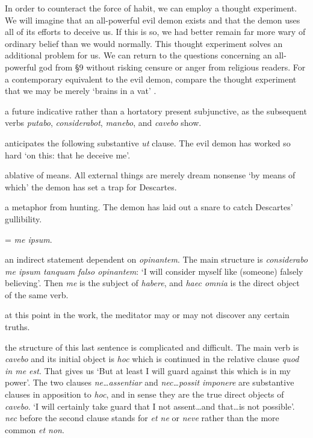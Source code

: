 \prenotes

In order to counteract the force of habit, we can employ a thought experiment. We will imagine that an all-powerful evil demon exists and that the demon uses all of its efforts to deceive us. If this is so, we had better remain far more wary of ordinary belief than we would normally. This thought experiment solves an additional problem for us. We can return to the questions concerning an all-powerful god from §9 without risking censure or anger from religious readers. For a contemporary equivalent to the evil demon, compare the thought experiment that we may be merely `brains in a vat' \citep[5]{harman1973}.

 a future indicative rather than a hortatory present subjunctive, as the subsequent verbs \textit{putabo}, \textit{considerabot}, \textit{manebo}, and \textit{cavebo} show.

 anticipates the following substantive \textit{ut} clause. The evil demon has worked so hard `on this: that he deceive me'.

 ablative of means. All external things are merely dream nonsense `by means of which' the demon has set a trap for Descartes.

 a metaphor from hunting. The demon has laid out a snare to catch Descartes' gullibility.

 = \textit{me ipsum}.

 an indirect statement dependent on \textit{opinantem}. The main structure is \textit{considerabo me ipsum tanquam falso opinantem}: `I will consider myself like (someone) falsely believing'. Then \textit{me} is the subject of \textit{habere}, and \textit{haec omnia} is the direct object of the same verb.

 at this point in the work, the meditator may or may not discover any certain truths.

 the structure of this last sentence is complicated and difficult. The main verb is \textit{cavebo} and its initial object is \textit{hoc} which is continued in the relative clause \textit{quod in me est}. That gives us `But at least I will guard against this which is in my power'. The two clauses \textit{ne\dots assentiar} and \textit{nec\dots possit imponere} are substantive clauses in apposition to \textit{hoc}, and in sense they are the true direct objects of \textit{cavebo}. `I will certainly take guard that I not assent\dots and that\dots is not possible'. \textit{nec} before the second clause stands for \textit{et ne} or \textit{neve} rather than the more common \textit{et non}.

